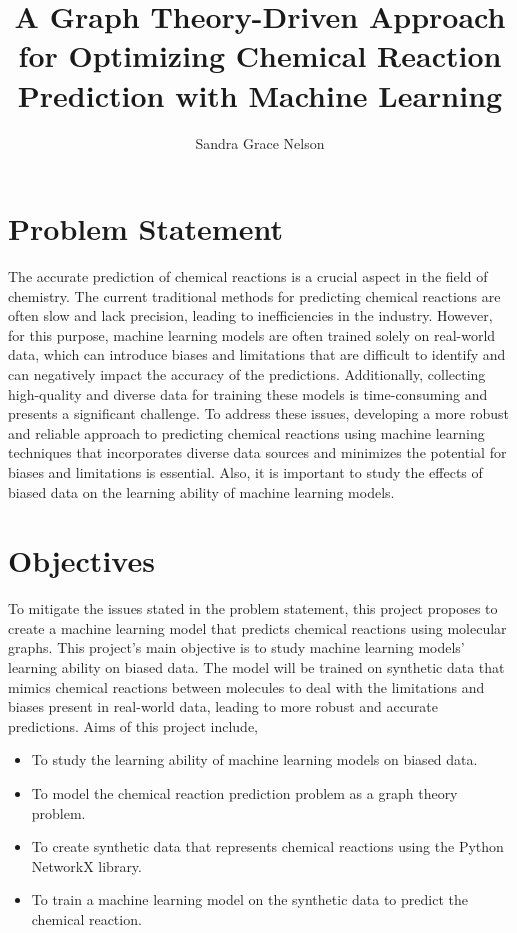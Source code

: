 \documentclass{article}
\title{\textbf{A Graph Theory-Driven Approach for Optimizing Chemical Reaction Prediction with Machine Learning}}
\author{Sandra Grace Nelson}
\begin{document}
\maketitle

\section{Problem Statement}
The accurate prediction of chemical reactions is a crucial aspect in the field of chemistry. The current traditional methods for predicting chemical reactions are often slow and lack precision, leading to inefficiencies in the industry. However, for this purpose, machine learning  models are often trained solely on real-world data, which can introduce biases and limitations that are difficult to identify and can negatively impact the accuracy of the predictions. Additionally, collecting high-quality and diverse data for training these models is time-consuming and presents a significant challenge. To address these issues, developing a more robust and reliable approach to predicting chemical reactions using machine learning techniques that incorporates diverse data sources and minimizes the potential for biases and limitations is essential. Also, it is important to study the effects of biased data on the learning ability of machine learning models. 

\section{Objectives}
To mitigate the issues stated in the problem statement, this project proposes to create a machine learning model that predicts chemical reactions using molecular graphs. This project's main objective is to study machine learning models' learning ability on biased data. The model will be trained on synthetic data that mimics chemical reactions between molecules to deal with the limitations and biases present in real-world data, leading to more robust and accurate predictions. Aims of this project include,
\begin{itemize}
    \item  To study the learning ability of machine learning models on biased data.
    \item To model the chemical reaction prediction problem as a graph theory problem.
    \item To create synthetic data that represents chemical reactions using the Python NetworkX library.
    \item To train a machine learning model on the synthetic data to predict the chemical reaction.
\end{itemize}
\end{document}
